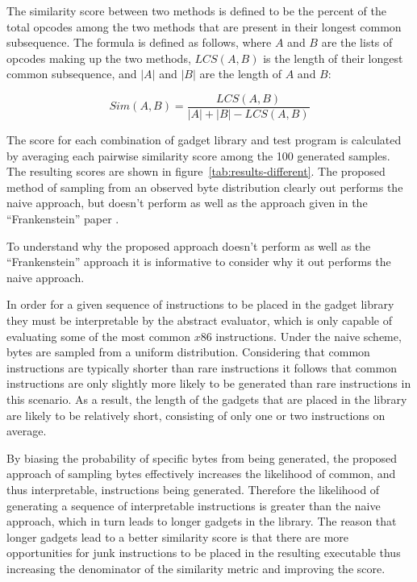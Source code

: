     The similarity score between two methods is defined to be the percent of the
    total opcodes among the two methods that are present in their longest common
    subsequence. The formula is defined as follows, where $A$ and $B$ are the
    lists of opcodes making up the two methods, $LCS(A,B)$ is the length of
    their longest common subsequence, and $|A|$ and $|B|$ are the length of $A$
    and $B$:

    $$Sim(A,B) = \frac{LCS(A,B)}{|A| + |B| - LCS(A,B)}$$

    The score for each combination of gadget library and test program is
    calculated by averaging each pairwise similarity score among the 100
    generated samples. The resulting scores are shown in
    figure~\ref{tab:results-different}. The proposed method of sampling from an
    observed byte distribution clearly out performs the naive approach, but
    doesn't perform as well as the approach given in the ``Frankenstein''
    paper \cite{franken}.

    To understand why the proposed approach doesn't perform as well as the
    ``Frankenstein'' approach it is informative to consider why it out performs
    the naive approach.
    
    In order for a given sequence of instructions to be placed in the gadget
    library they must be interpretable by the abstract evaluator, which is only
    capable of evaluating some of the most common $x86$ instructions. Under the
    naive scheme, bytes are sampled from a uniform distribution. Considering
    that common instructions are typically shorter than rare instructions it
    follows that common instructions are only slightly more likely to be
    generated than rare instructions in this scenario. As a result, the length
    of the gadgets that are placed in the library are likely to be relatively
    short, consisting of only one or two instructions on average.

    By biasing the probability of specific bytes from being generated, the
    proposed approach of sampling bytes effectively increases the likelihood of
    common, and thus interpretable, instructions being generated. Therefore the
    likelihood of generating a sequence of interpretable instructions is greater
    than the naive approach, which in turn leads to longer gadgets in the
    library. The reason that longer gadgets lead to a better similarity score is
    that there are more opportunities for junk instructions to be placed in the
    resulting executable thus increasing the denominator of the similarity
    metric and improving the score.
    
